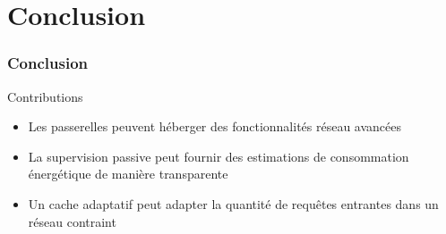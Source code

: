 \section{Conclusion}

\begin{frame}\frametitle{Conclusion}

  \begin{alertblock}{Contributions}
    \begin{itemize}
      \item Les passerelles peuvent héberger des fonctionnalités réseau avancées
      \item La supervision passive peut fournir des estimations de consommation énergétique de manière transparente
      \item Un cache adaptatif peut adapter la quantité de requêtes entrantes dans un réseau contraint
    \end{itemize}
  \end{alertblock}

\end{frame}

